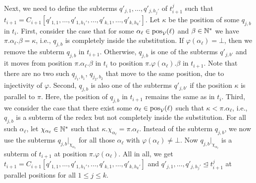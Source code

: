 \begin{myproof}
\begin{itemize}
       
        Next, we need to define the subterms
        $q'_{j,1}, \ldots, q'_{j, h_j'}$ of $t_{i+1}^j$ 
        such that $t_{i+1} = C_{i+1}[q'_{1,1}, \ldots, q'_{1, h_1'}, \ldots,
          q'_{k,1}, \ldots, q'_{k, h_k'}]$.
        Let $\kappa$ be the position of some $q_{j,b}$ in $t_i$.
        First, consider the case that
        for some $\alpha_{\ell} \in \mathrm{pos}_{\mathcal{V}}(\ell)$ and $\beta \in \mathbb{N}^*$ we have $\pi.\alpha_{\ell}.\beta = \kappa$, 
        i.e., $q_{j,b}$ is completely inside the substitution.
        If $\varphi(\alpha_{\ell}) = \bot$, then we remove the subterm $q_{j,b}$ in $t_{i+1}$.
        Otherwise, $q_{j,b}$ is one of the subterms $q'_{j,b'}$ and it moves from position $\pi.\alpha_{\ell}.\beta$
        in $t_i$ to position $\pi.\varphi(\alpha_{\ell}).\beta$ in $t_{i+1}$.
        Note that there are no two such $q_{j_1,b_1}$, $q_{j_2,b_2}$ that move to the same position,
        due to injectivity of $\varphi$.
        Second, $q_{j,b}$ is also one of the subterms $q'_{j,b'}$ if the
        position $\kappa$ is parallel to $\pi$.
        Here, the position of $q_{j,b}$ in $t_{i+1}$ remains the same as in $t_i$.
        Third, we consider the case that 
        there exist some $\alpha_{\ell} \in \mathrm{pos}_{\mathcal{V}}(\ell)$ such that $\kappa < \pi.\alpha_{\ell}$,
        i.e., $q_{j,b}$ is a subterm of the redex but not completely inside the substitution.
        For all such $\alpha_{\ell}$, let $\chi_{\alpha_\ell} \in \mathbb{N}^*$ such that
        $\kappa.\chi_{\alpha_\ell} = \pi.\alpha_{\ell}$.
        Instead of the subterm $q_{j,b}$, we now 
        use the subterms $q_{j,b}|_{\chi_{\alpha_\ell}}$ for all those $\alpha_\ell$ with $\varphi(\alpha_{\ell}) \neq \bot$. 
        Now $q_{j,b}|_{\chi_{\alpha_\ell}}$ is a subterm of $t_{i+1}$ at position $\pi.\varphi(\alpha_{\ell})$.
        All in all, we get $t_{i+1} = C_{i+1}[q'_{1,1}, \ldots, q'_{1, h_1'}, \ldots,
        q'_{k,1}, \ldots, q'_{k, h_k'}]$ and $q'_{j,1},\ldots,q'_{j,h_j'} \trianglelefteq t_{i+1}^j$ at parallel positions for all $1
        \leq j \leq k$.


\end{itemize}
\end{myproof}
